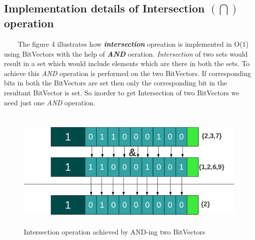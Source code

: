 \documentclass[12pt,a4paper]{article}
\begin{document}
\subsection{Implementation details of Intersection $(\bigcap)$ operation}
\ \ \ \ The figure 4 illustrates how \textit{\textbf{intersection}} opreation is implemented in O(1) using BitVectors with the help of \textit{\textbf{AND}} oeration. \textit{Intersection} of two sets would result in a set which would include elements which are there in both the sets. To achieve this \textit{AND} operation is performed on the two BitVectors. If corresponding bits in both the BitVectors are set then only the corresponding bit in the resultant BitVector is set. So inorder to get Intersection of two BitVectors we need just one \textit{AND} operation.
\begin{figure}[H]
\begin{center}
\ \newline
\includegraphics[height=50mm, scale=.5]{intersection.png}
\caption{Intersection operation achieved by AND-ing two BitVectors}
\end{center}
\end{figure}
\end{document}
